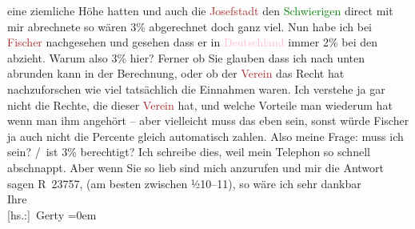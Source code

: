                     eine ziemliche Höhe hatten und auch die \textcolor{brown}{Josefstadt}{}\ledrightnote{\textcolor{brown}{Theater in der Josefstadt}} den \textcolor{green}{Schwierigen}{}\ledrightnote{\textcolor{green}{Der Schwierige. Lustspiel in drei Akten}} direct
                    mit mir abrechnete so wären 3{\%}{ } abgerechnet doch ganz
                    viel.\pend
           \pstart
           Nun habe ich bei \textcolor{brown}{Fischer}{}\ledrightnote{\textcolor{brown}{S. Fischer Verlag}} nachgesehen und gesehen
                    dass er in \textcolor{pink}{Deutschland}{}\ledrightnote{\textcolor{pink}{Deutschland}} immer 2{\%} bei den \label{T_L02525_1v}\label{T_L02525_1h} abzieht. Warum also 3{\%} hier? Ferner ob Sie glauben dass ich nach unten
                    abrunden kann in der Berechnung, oder ob der \textcolor{brown}{Verein}{} das Recht hat nachzuforschen wie viel tatsächlich
                    die Einnahmen waren. Ich verstehe ja gar nicht die Rechte, die dieser \textcolor{brown}{Verein}{} hat, und welche
                    Vorteile man wiederum hat wenn man ihm angehört – aber vielleicht muss das eben
                    sein, sonst würde Fischer ja auch nicht die Percente gleich automatisch
                    zahlen.\pend
           \pstart
           Also meine Frage: muss ich  sein?\pend
           / ist 3{\%} berechtigt?\pend
           \pstart
           Ich schreibe dies, weil mein Telephon so schnell abschnappt. Aber wenn Sie so
                    lieb sind mich anzurufen und mir die Antwort sagen R 23757, (am besten zwischen
                        ½10–11), so wäre ich sehr dankbar\pend
           \pstart
           \label{T_L02525_2v}\label{T_L02525_2h}{\\[\baselineskip]}Ihre{\\[\baselineskip]}\spacefill\mbox{{[}hs.:{]} Gerty}\pend
           \leftskip=0em{}\endnumbering{}  
      